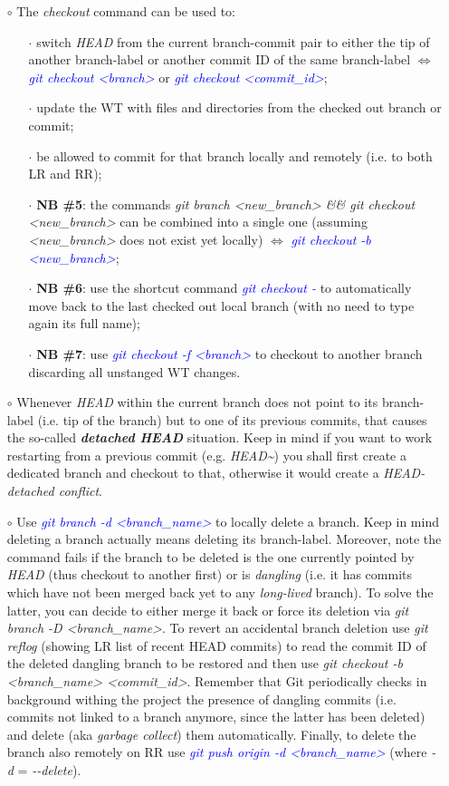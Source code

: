 \documentclass[a4paper,portrait,10pt]{article}   %
\newcommand{\mybulletlvA}{$\circ$}   %
\newcommand{\mybulletlvB}{$\cdot$}   %
\newcommand{\mydiv}{$\Leftrightarrow$ }   %
\newcommand{\mycmd}[1]{\textcolor{blue}{\textit{#1}}}   %
\newcommand{\myvspace}{\vspace{4mm}}   %
\begin{document}
\begin{itemize}
\item[\mybulletlvA] The \textit{checkout} command can be used to:
\begin{itemize}
  \item[\mybulletlvB] switch \textit{HEAD} from the current branch-commit pair to either the tip of another branch-label or another commit ID of the same branch-label \mydiv \mycmd{git checkout <branch>} or \mycmd{git checkout <commit\_id>};
  \item[\mybulletlvB] update the WT with files and directories from the checked out branch or commit;
  \item[\mybulletlvB] be allowed to commit for that branch locally and remotely (i.e. to both LR and RR);
  \item[\mybulletlvB] \textbf{NB \#5}: the commands \textit{git branch <new\_branch> \&\& git checkout <new\_branch>} can be combined into a single one (assuming \textit{<new\_branch>} does not exist yet locally) \mydiv \mycmd{git checkout -b <new\_branch>};
  \item[\mybulletlvB] \textbf{NB \#6}: use the shortcut command \mycmd{git checkout -} to automatically move back to the last checked out local branch (with no need to type again its full name);
  \item[\mybulletlvB] \textbf{NB \#7}: use \mycmd{git checkout -f <branch>} to checkout to another branch discarding all unstanged WT changes.
\end{itemize}
\myvspace

\item[\mybulletlvA] Whenever \textit{HEAD} within the current branch does not point to its branch-label (i.e. tip of the branch) but to one of its previous commits, that causes the so-called \textbf{\textit{detached HEAD}} situation. Keep in mind if you want to work restarting from a previous commit (e.g. \textit{HEAD\textasciitilde}) you shall first create a dedicated branch and checkout to that, otherwise it would create a \textit{HEAD-detached conflict}.
\myvspace

\item[\mybulletlvA] Use \mycmd{git branch -d <branch\_name>} to locally delete a branch. Keep in mind deleting a branch actually means deleting its branch-label. Moreover, note the command fails if the branch to be deleted is the one currently pointed by \textit{HEAD} (thus checkout to another first) or is \textit{dangling} (i.e. it has commits which have not been merged back yet to any \textit{long-lived} branch). To solve the latter, you can decide to either merge it back or force its deletion via \textit{git branch -D <branch\_name>}. To revert an accidental branch deletion use \textit{git reflog} (showing LR list of recent HEAD commits) to read the commit ID of the deleted dangling branch to be restored and then use \textit{git checkout -b <branch\_name> <commit\_id>}. Remember that Git periodically checks in background withing the project the presence of dangling commits (i.e. commits not linked to a branch anymore, since the latter has been deleted) and delete (aka \textit{garbage collect}) them automatically. Finally, to delete the branch also remotely on RR use \mycmd{git push origin -d <branch\_name>} (where \textit{-d} = \textit{-{}-delete}).
\end{itemize}
\end{document}
